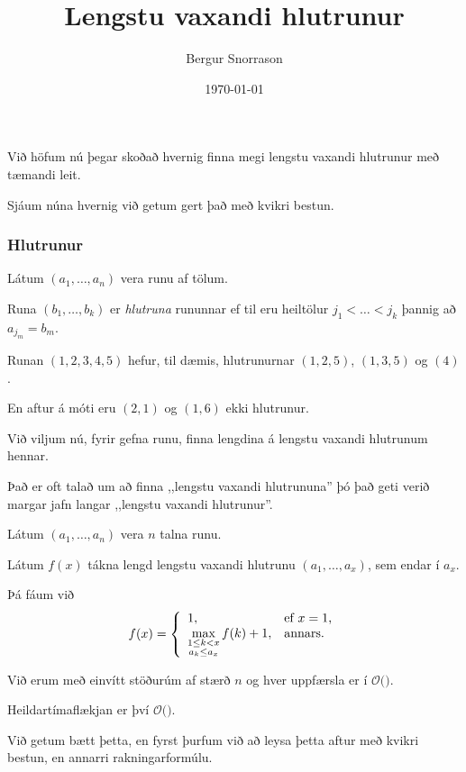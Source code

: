\title{Lengstu vaxandi hlutrunur}
\author{Bergur Snorrason}
\date{\today}



\frame{\titlepage}

{
	{
		\item<1-> Við höfum nú þegar skoðað hvernig finna megi lengstu vaxandi hlutrunur með tæmandi leit.
		\item<2-> Sjáum núna hvernig við getum gert það með kvikri bestun.
	}
}

{
	\frametitle{Hlutrunur}
	{
		\item<1-> Látum $(a_1, \dots, a_n)$ vera runu af tölum.
		\item<2-> Runa $(b_1, \dots, b_k)$ er \emph{hlutruna} rununnar ef til eru heiltölur $j_1 < \dots < j_k$ þannig að $a_{j_m} = b_m$.
		\item<3-> Runan $(1, 2, 3, 4, 5)$ hefur, til dæmis, hlutrunurnar $(1, 2, 5)$, $(1, 3, 5)$ og $(4)$.
		\item<4-> En aftur á móti eru $(2, 1)$ og $(1, 6)$ ekki hlutrunur.
		\item<5-> Við viljum nú, fyrir gefna runu, finna lengdina á lengstu vaxandi hlutrunum hennar.
		\item<6-> Það er oft talað um að finna ,,lengstu vaxandi hlutrununa'' þó það geti verið margar jafn langar ,,lengstu vaxandi hlutrunur''.
	}
}

{
	{
		\item<1-> Látum $(a_1, \dots, a_n)$ vera $n$ talna runu.
		\item<2-> Látum $f(x)$ tákna lengd lengstu vaxandi hlutrunu $(a_1, \dots, a_x)$, sem endar í $a_x$.
		\item<3-> Þá fáum við
		\[
			f(x) = \left \{
			\env{array}
			{ {l l}
				1, & \text{ef $x = 1$,} \\
				\displaystyle \max_{\substack{1 \leq k < x\\a_k \leq a_x}} f(k) + 1, & \text{annars.}
			}
			\right .
		\]
	}
}

{
}

{
	{
		\item<1-> Við erum með einvítt stöðurúm af stærð $n$ og hver uppfærsla er í $\mathcal{O}($\onslide<2->{$\,n\,$}$)$.
		\item<3-> Heildartímaflækjan er því $\mathcal{O}($\onslide<4->{$n^2$}$)$.
		\item<5-> Við getum bætt þetta, en fyrst þurfum við að leysa þetta aftur með kvikri bestun, en annarri rakningarformúlu.
	}
}

